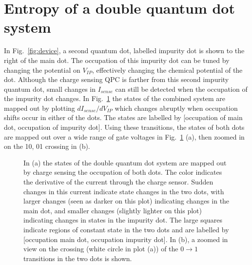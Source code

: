 \section{Entropy of a double quantum dot system}
\label{sec:dqd}

In Fig.~\ref{fig:device}, a second quantum dot, labelled impurity dot is shown to the right of the main dot. The occupation of this impurity dot can be tuned by changing the potential on $V_{IP}$, effectively changing the chemical potential of the dot. Although the charge sensing \ac{QPC} is farther from this second impurity quantum dot, small changes in $I_{sense}$ can still be detected when the occupation of the impurity dot changes. In Fig.~\ref{fig:qdpanel2} the states of the combined system are mapped out by plotting $dI_{sense}/dV_{IP}$ which changes abruptly when occupation shifts occur in either of the dots. The states are labelled by [occupation of main dot, occupation of impurity dot]. Using these transitions, the states of both dots are mapped out over a wide range of gate voltages in Fig.~\ref{fig:qdpanel2} (a), then zoomed in on the 10, 01 crossing in (b).

\begin{figure}[h]
\centering
{}
\caption{In (a) the states of the double quantum dot system are mapped out by charge sensing the occupation of both dots. The color indicates the derivative of the current through the charge sensor. Sudden changes in this current indicate state changes in the two dots, with larger changes (seen as darker on this plot) indicating changes in the main dot, and smaller changes (slightly lighter on this plot) indicating changes in states in the impurity dot. The large squares indicate regions of constant state in the two dots and are labelled by [occupation main dot, occupation impurity dot]. In (b), a zoomed in view on the crossing (white circle in plot (a)) of the $0 \to 1$ transitions in the two dots is shown.}
\label{fig:qdpanel2}       %
\end{figure}


